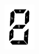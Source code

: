 \documentclass[12pt]{jarticle}
\begin{document}
\begin{figure}[h]
\begin{minipage}{0.2\linewidth}
        \includegraphics[width=\linewidth]{../img/Segment_EN.pdf}
    \end{minipage}
\end{figure}
\end{document}
